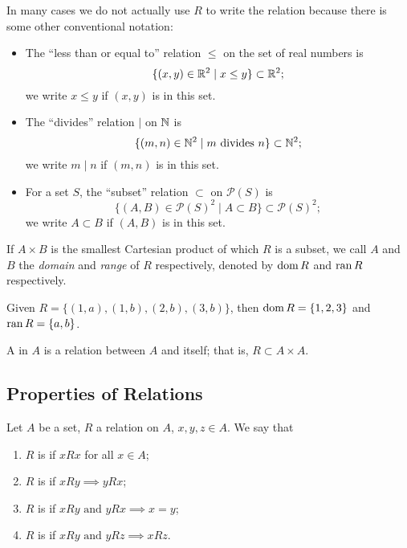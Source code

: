 \begin{example}
In many cases we do not actually use $R$ to write the relation because there is some other conventional notation:
\begin{itemize}
\item The ``less than or equal to'' relation $\le$ on the set of real numbers is
\[\{(x,y) \in \mathbb R^2 \mid x \le y\}\subset\mathbb R^2;\]
we write $x\le y$ if $(x,y)$ is in this set.
\item The ``divides'' relation $\mid$ on $\mathbb N$ is
\[\{(m,n)\in\mathbb N^2\mid m\text{ divides }n\}\subset\mathbb N^2;\]
we write $m\mid n$ if $(m,n)$ is in this set.
\item For a set $S$, the ``subset'' relation $\subset$ on $\mathcal{P}(S)$ is
\[\{(A,B)\in\mathcal{P}(S)^2\mid A\subset B\}\subset\mathcal{P}(S)^2;\]
we write $A\subset B$ if $(A,B)$ is in this set.
\end{itemize}
\end{example}

If $A \times B$ is the smallest Cartesian product of which $R$ is a subset, we call $A$ and $B$ the \emph{domain} and \emph{range} of $R$ respectively, denoted by $\operatorname{dom} R$ and $\operatorname{ran} R$ respectively.

\begin{example}
Given $R=\{(1,a),(1,b),(2,b),(3,b)\}$, then $\operatorname{dom} R=\{1,2,3\}$ and $\operatorname{ran} R=\{a,b\}$.
\end{example}

\begin{definition}
A  in $A$ is a relation between $A$ and itself; that is, $R \subset A \times A$.
\end{definition}

\subsection{Properties of Relations}
Let $A$ be a set, $R$ a relation on $A$, $x,y,z \in A$. We say that
\begin{enumerate}[label=(\roman*)]
\item $R$ is  if $xRx$ for all $x\in A$;
\item $R$ is  if $xRy \implies yRx$;
\item $R$ is  if $xRy \text{ and } yRx \implies x=y$;
\item $R$ is  if $xRy \text{ and } yRz \implies xRz$.
\end{enumerate}

